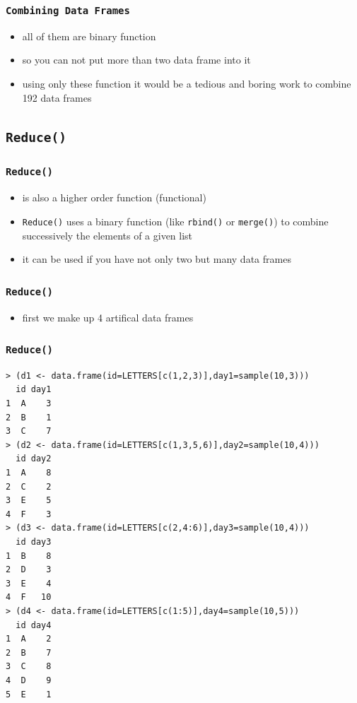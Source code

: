 \documentclass[xcolor={table},c]{beamer}
\begin{document}
\begin{frame}[fragile]\frametitle{\texttt{Combining Data Frames}}
\begin{itemize}
\item all of them are binary function
\item so you can not put more than two data frame into it
\item using only these function it would be a tedious and boring work to combine 192 data frames
\end{itemize}
\end{frame}


\subsection{\texttt{Reduce()}}
\begin{frame}[fragile]\frametitle{\texttt{Reduce()}}
\begin{itemize}
\item is also a higher order function (functional)
\item \texttt{Reduce()} uses a binary function (like \texttt{rbind()} or \texttt{merge()}) to combine successively the elements of a given list
\item it can be used if you have not only two but many data frames
\end{itemize}
\end{frame}


\begin{frame}[fragile]\frametitle{\texttt{Reduce()}}
  \begin{itemize}
  \item first we make up 4 artifical data frames
  \end{itemize}
\end{frame}


\begin{frame}[fragile]\frametitle{\texttt{Reduce()}}\tiny
\begin{verbatim}
> (d1 <- data.frame(id=LETTERS[c(1,2,3)],day1=sample(10,3)))
  id day1
1  A    3
2  B    1
3  C    7
> (d2 <- data.frame(id=LETTERS[c(1,3,5,6)],day2=sample(10,4)))
  id day2
1  A    8
2  C    2
3  E    5
4  F    3
> (d3 <- data.frame(id=LETTERS[c(2,4:6)],day3=sample(10,4)))
  id day3
1  B    8
2  D    3
3  E    4
4  F   10
> (d4 <- data.frame(id=LETTERS[c(1:5)],day4=sample(10,5)))
  id day4
1  A    2
2  B    7
3  C    8
4  D    9
5  E    1
\end{verbatim}
\end{frame}
\end{document}
